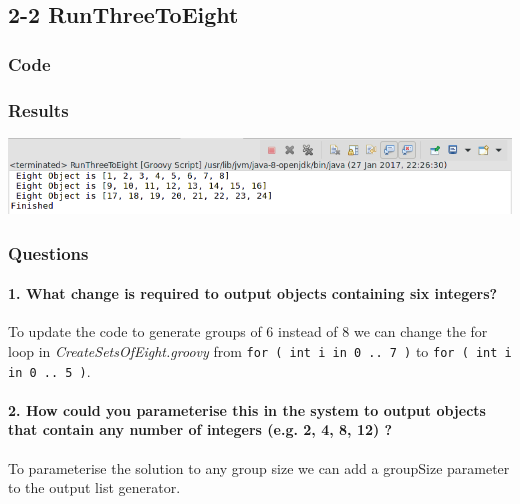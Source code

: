 \subsection{2-2 RunThreeToEight}

\subsubsection*{Code}


\subsubsection*{Results}

\includegraphics[width=\textwidth]{img/screenshots/2-2.png}


\subsubsection*{Questions}

\paragraph{1. What change is required to output objects containing six integers?}

To update the code to generate groups of 6 instead of 8 we can change the for loop in {\em CreateSetsOfEight.groovy} from \texttt{for ( int i in 0 .. 7 )} to \texttt{for ( int i in 0 .. 5 )}.

\paragraph{2. How could you parameterise this in the system to output objects that contain any number of integers (e.g. 2, 4, 8, 12) ?}

To parameterise the solution to any group size we can add a groupSize parameter to the output list generator.

